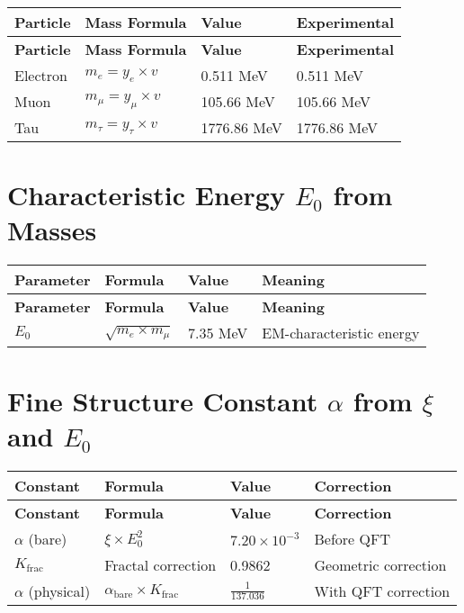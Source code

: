 \documentclass[12pt,a4paper]{article}
\begin{document}
	\begin{longtable}{|p{3cm}|p{4cm}|p{3cm}|p{3cm}|}
		\hline
		\textbf{Particle} & \textbf{Mass Formula} & \textbf{Value} & \textbf{Experimental} \\
		\hline
		\endfirsthead
		\hline
		\textbf{Particle} & \textbf{Mass Formula} & \textbf{Value} & \textbf{Experimental} \\
		\hline
		\endhead
		Electron & \(m_e = y_e \times v\) & 0.511 MeV & 0.511 MeV \\
		\hline
		Muon & \(m_{\mu} = y_{\mu} \times v\) & 105.66 MeV & 105.66 MeV \\
		\hline
		Tau & \(m_{\tau} = y_{\tau} \times v\) & 1776.86 MeV & 1776.86 MeV \\
		\hline
	\end{longtable}
	
	\section{Characteristic Energy \(E_0\) from Masses}
	
	\begin{longtable}{|p{3cm}|p{4cm}|p{3cm}|p{4cm}|}
		\hline
		\textbf{Parameter} & \textbf{Formula} & \textbf{Value} & \textbf{Meaning} \\
		\hline
		\endfirsthead
		\hline
		\textbf{Parameter} & \textbf{Formula} & \textbf{Value} & \textbf{Meaning} \\
		\hline
		\endhead
		\(E_0\) & \(\sqrt{m_e \times m_{\mu}}\) & 7.35 MeV & EM-characteristic energy \\
		\hline
	\end{longtable}
	
	\section{Fine Structure Constant \(\alpha\) from \(\xi\) and \(E_0\)}
	
	\begin{longtable}{|p{3cm}|p{4cm}|p{3cm}|p{3cm}|}
		\hline
		\textbf{Constant} & \textbf{Formula} & \textbf{Value} & \textbf{Correction} \\
		\hline
		\endfirsthead
		\hline
		\textbf{Constant} & \textbf{Formula} & \textbf{Value} & \textbf{Correction} \\
		\hline
		\endhead
		\(\alpha\) (bare) & \(\xi \times E_0^2\) & \(7.20 \times 10^{-3}\) & Before QFT \\
		\hline
		\(K_{\text{frac}}\) & Fractal correction & 0.9862 & Geometric correction \\
		\hline
		\(\alpha\) (physical) & \(\alpha_{\text{bare}} \times K_{\text{frac}}\) & \(\frac{1}{137.036}\) & With QFT correction \\
		\hline
	\end{longtable}
	
\end{document}
